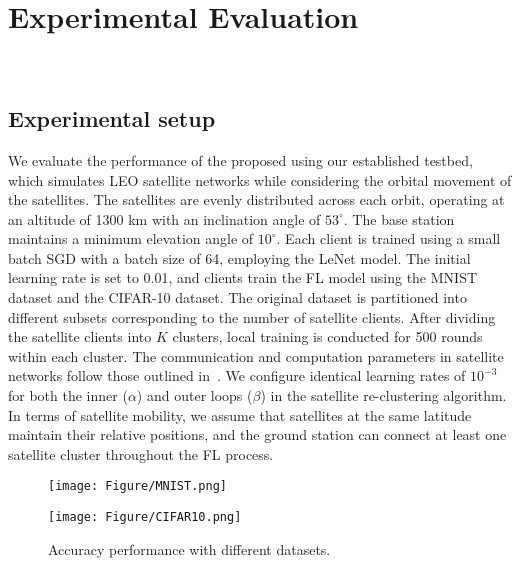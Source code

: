 \section{Experimental Evaluation}~\label{sec:evaluation}

\subsection{Experimental setup}

We evaluate the performance of the proposed \algname using our established testbed, which simulates LEO satellite networks while considering the orbital movement of the satellites. The satellites are evenly distributed across each orbit, operating at an altitude of 1300 km with an inclination angle of $53^{\circ}$. The base station maintains a minimum elevation angle of $10^{\circ}$. Each client is trained using a small batch SGD with a batch size of 64, employing the LeNet model. The initial learning rate is set to 0.01, and clients train the FL model using the MNIST dataset and the CIFAR-10 dataset. The original dataset is partitioned into different subsets corresponding to the number of satellite clients. After dividing the satellite clients into $K$ clusters, local training is conducted for 500 rounds within each cluster. The communication and computation parameters in satellite networks follow those outlined in~\cite{ZhuJSAC23, ZhangIoT23}.
We configure identical learning rates of $10^{-3}$ for both the inner ($\alpha$) and outer loops ($\beta$) in the satellite re-clustering algorithm. In terms of satellite mobility, we assume that satellites at the same latitude maintain their relative positions, and the ground station can connect at least one satellite cluster throughout the FL process. 


\begin{figure}[tb!]
	\centering
	\begin{minipage}[b]{.493\columnwidth}
		\centering
		\texttt{[image: Figure/MNIST.png]}
		\label{fig:1_acc}
	\end{minipage}
        \begin{minipage}[b]{.493\columnwidth}
		\centering
		
		\texttt{[image: Figure/CIFAR10.png]}
		\label{fig:3_acc}
	\end{minipage}

	\caption{Accuracy performance with different datasets.}
    
	\label{fig:accuracy}
\end{figure}



